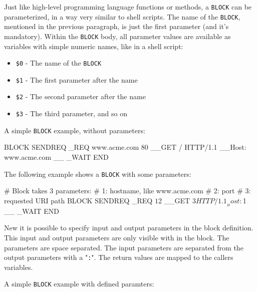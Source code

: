 Just like high-level programming language functions or methods, 
a \texttt{BLOCK} can be parameterized, in a way 
very similar to shell scripts. The name of the \texttt{BLOCK}, mentioned 
in the previous paragraph, is just the first parameter (and it's 
mandatory). Within the \texttt{BLOCK} body, all parameter values are 
available as variables with simple numeric names, like in a shell script:

\begin{itemize}
  \item \texttt{\$0} - The name of the \texttt{BLOCK}
  \item \texttt{\$1} - The first parameter after the name
  \item \texttt{\$2} - The second parameter after the name
  \item \texttt{\$3} - The third parameter, and so on
\end{itemize}

A simple \texttt{BLOCK} example, without parameters:

\begin{usplisting}
    BLOCK SENDREQ
    _REQ www.acme.com 80
    __GET / HTTP/1.1
    __Host: www.acme.com
    __
    _WAIT
    END
\end{usplisting}

The following example shows a \texttt{BLOCK} with some parameters:

\begin{usplisting}
    # Block takes 3 parameters:
    # 1: hostname, like www.acme.com
    # 2: port
    # 3: requested URI path
    BLOCK SENDREQ
    _REQ $1 $2
    __GET $3 HTTP/1.1
    __Host: $1
    __
    _WAIT
    END
\end{usplisting}

New it is possible to specify input and output parameters in the block
definition. This input and output parameters are only visible with in the block.
The parameters are space separated. The input parameters are separated from 
the output parameters with a "\texttt{:}". The return values are mapped
to the callers variables.

A simple \texttt{BLOCK} example with defined paramters:


